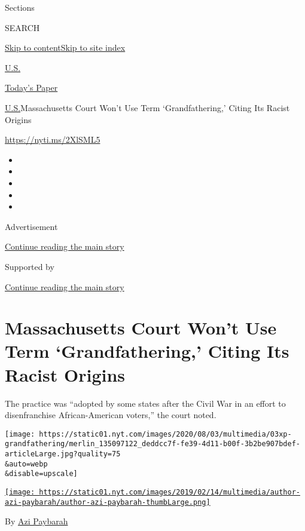 Sections

SEARCH

\protect\hyperlink{site-content}{Skip to
content}\protect\hyperlink{site-index}{Skip to site index}

\href{https://www.nytimes.com/section/us}{U.S.}

\href{https://myaccount.nytimes.com/auth/login?response_type=cookie\&client_id=vi}{}

\href{https://www.nytimes.com/section/todayspaper}{Today's Paper}

\href{/section/us}{U.S.}\textbar{}Massachusetts Court Won't Use Term
`Grandfathering,' Citing Its Racist Origins

\url{https://nyti.ms/2XlSML5}

\begin{itemize}
\item
\item
\item
\item
\item
\end{itemize}

Advertisement

\protect\hyperlink{after-top}{Continue reading the main story}

Supported by

\protect\hyperlink{after-sponsor}{Continue reading the main story}

\hypertarget{massachusetts-court-wont-use-term-grandfathering-citing-its-racist-origins}{%
\section{Massachusetts Court Won't Use Term `Grandfathering,' Citing Its
Racist
Origins}\label{massachusetts-court-wont-use-term-grandfathering-citing-its-racist-origins}}

The practice was ``adopted by some states after the Civil War in an
effort to disenfranchise African-American voters,'' the court noted.

\texttt{[image: https://static01.nyt.com/images/2020/08/03/multimedia/03xp-grandfathering/merlin\_135097122\_deddcc7f-fe39-4d11-b00f-3b2be907bdef-articleLarge.jpg?quality=75\\\&auto=webp\\\&disable=upscale]}

\href{https://www.nytimes.com/by/azi-paybarah}{\texttt{[image: https://static01.nyt.com/images/2019/02/14/multimedia/author-azi-paybarah/author-azi-paybarah-thumbLarge.png]}}

By \href{https://www.nytimes.com/by/azi-paybarah}{Azi Paybarah}

